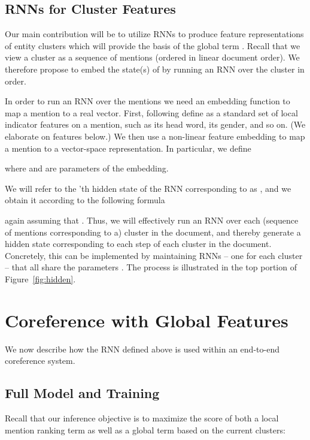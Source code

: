 \documentclass[11pt,letterpaper]{article}
\begin{document}
\subsection{RNNs for Cluster Features}
Our main contribution will be to utilize RNNs to produce
feature representations of entity clusters which will provide the basis of the global term . Recall that we view a cluster  as a sequence of mentions  (ordered in linear document order). We therefore propose to embed the state(s) of  by running an RNN over the cluster in order.

In order to run an RNN over the mentions we need an embedding function  to map a mention to a real vector. First, following  define  as a standard set of local indicator features on a mention, such as its head word, its gender, and so on. (We elaborate on features below.) We then use a non-linear feature embedding  to map a mention  to a vector-space representation. In particular, we define

\vspace{-3mm}

{\small

}

\vspace{-5mm}
\noindent where  and  are parameters of the embedding.

We will refer to the 'th hidden state of the RNN corresponding to  as , and we obtain it according to the following formula
{\small

} 

\vspace{-4mm}
\noindent again assuming that . Thus, we will effectively run an RNN over each (sequence of mentions corresponding to a) cluster  in the document, and thereby generate a hidden state  corresponding to each step of each cluster in the document.  Concretely, this can be implemented by maintaining  RNNs -- one for each cluster -- that all share the parameters . The process is illustrated in the top portion of Figure~\ref{fig:hidden}.
 
\section{Coreference with Global Features}
\label{sec:fullmod}
We now describe how the RNN defined above is used within an end-to-end coreference system. 
\subsection{Full Model and Training}
\label{sec:model}
Recall that our inference objective is to maximize the score of both a local mention ranking term as well as a global term based on the current clusters: 
\vspace{-1mm}
{\small

}
\end{document}
